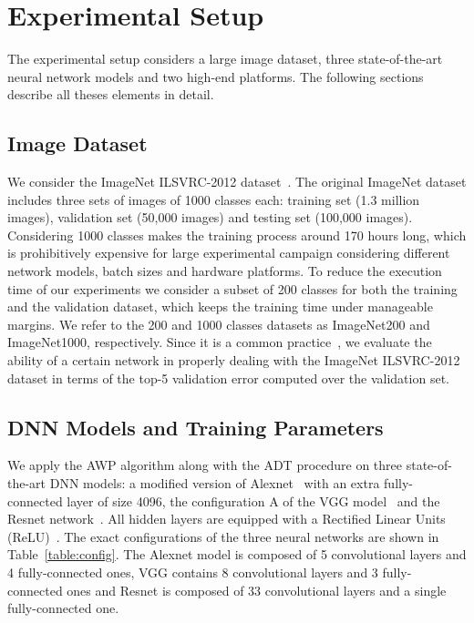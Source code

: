 \section{Experimental Setup}
\label{sec:setup}

The experimental setup considers a large image dataset, three state-of-the-art neural network models and two high-end platforms.
The following sections describe all theses elements in detail.

\subsection{Image Dataset}
We consider the ImageNet ILSVRC-2012 
dataset~\cite{imagenet}.
The original ImageNet dataset includes three sets of images of 1000 classes each:
training set (1.3 million images), validation set (50,000 images) and
testing set (100,000 images).
Considering 1000 classes makes the training process around 170 hours long, which is prohibitively expensive for large experimental campaign considering different network models, batch sizes and hardware platforms.
To reduce the execution time of our experiments we consider a subset of 200 
classes for both the training and the validation dataset, which keeps the training time under manageable margins.
We refer to the 200 and 1000 classes datasets as ImageNet200 and ImageNet1000, respectively.
Since it is a common practice~\cite{vgg}, we evaluate the ability of a certain network in 
properly dealing with the ImageNet ILSVRC-2012 dataset in terms of the top-5 validation error computed over the validation set.

\subsection{DNN Models and Training Parameters}
We apply the AWP algorithm along with the ADT procedure on three state-of-the-art 
DNN models: a modified version of Alexnet~\cite{alexnet} with an extra fully-connected layer of size 4096, the configuration A of the VGG model~\cite{vgg} and the Resnet network~\cite{resnet}. 
All hidden layers are equipped with a Rectified Linear Units (ReLU)~\cite{alexnet}.
The exact configurations of the three neural networks are shown in Table~\ref{table:config}. 
The Alexnet model is composed of 5 convolutional layers and 4 fully-connected ones, VGG contains 8 convolutional layers and 3 fully-connected ones and Resnet is composed of 33 convolutional layers and a single fully-connected one.

